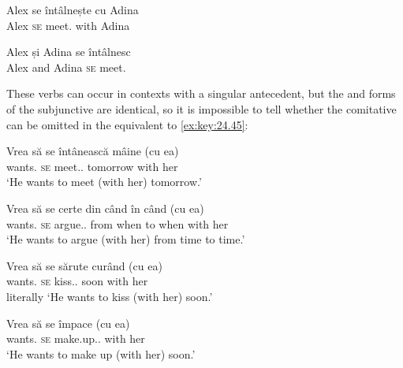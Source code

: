 \documentclass[output=paper]{langsci/langscibook}
\begin{document}
\ea%
    \label{ex:key:24.42}
\z

\ea%
    \label{ex:key:24.43}
    \sn
	\gll Alex     se   întâlnește   cu   Adina\\
		Alex     \textsc{se}   meet.\Tsg{}  with  Adina\\
\z

\ea%
    \label{ex:key:24.44}
    \sn
	\gll Alex și Adina   se   întâlnesc\\
		Alex and Adina   \textsc{se}   meet.\Tpl{}\\
\z

These verbs can occur in  contexts with a singular antecedent, but the
\Tsg{} and \Tpl{} forms of the subjunctive are identical, so it is impossible
to tell whether the comitative can be omitted in the equivalent to \eqref{ex:key:24.45}:

\ea%
    \label{ex:key:24.45}
    \sn
	\gll Vrea    să   se   întânească    mâine     (cu   ea)\\
    wants.\Tsg{} \Sbjv{}   \textsc{se}   meet.\Sbjv{}.\Third{}   tomorrow \hphantom{(}with   her\\
	\glt ‘He wants to meet (with her) tomorrow.’
\z

\ea%
    \label{ex:key:24.46}
    \sn
	\gll Vrea     să   se   certe     din   când   în   când   (cu   ea)\\
    wants.\Tsg{} \Sbjv{}   \textsc{se}   argue.\Sbjv{}.\Third{}   from   when to   when  \hphantom{(}with   her\\
	\glt ‘He wants to argue (with her) from time to time.’
\z

\ea%
    \label{ex:key:24.47}
    \sn
	\gll Vrea    să   se   sărute       curând     (cu   ea)\\
    wants.\Tsg{} \Sbjv{}   \textsc{se}   kiss.\Sbjv{}.\Third{}      soon \hphantom{(}with   her\\
	\glt literally ‘He wants to kiss (with her) soon.’
\z\newpage

\ea%
    \label{ex:key:24.48}
    \sn
	\gll Vrea   să   se   împace     (cu   ea)\\
    wants.\Tsg{} \Sbjv{}   \textsc{se}   make.up.\Sbjv{}.\Third{}  \hphantom{(}with  her\\
	\glt ‘He wants to make up (with her) soon.’
\z
\end{document}
